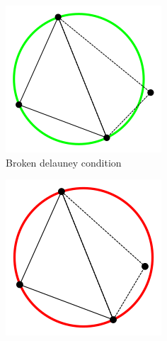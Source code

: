 \begin{center}
    \begin{figure}[H]
        \centering
        \begin{subfigure}[b]{0.45\textwidth}
            \centering
            \includegraphics[width=\textwidth]{resources/images/introduction/Point_outside_circle.png}
            \caption{Broken delauney condition}
            \label{fig:brokenDelauneyCondition}
        \end{subfigure}
        \hfill
        \begin{subfigure}[b]{0.45\textwidth}
            \centering
            \includegraphics[width=\textwidth]{resources/images/introduction/Point_inside_circle.png}

\end{subfigure}
\end{figure}
\end{center}
